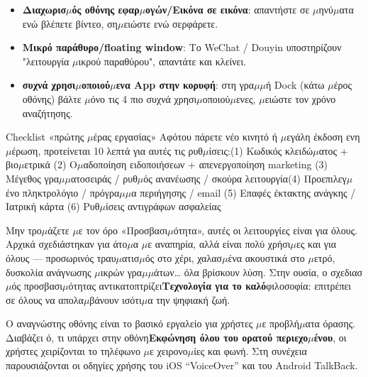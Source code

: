
\begin{itemize}
  \item \textbf{Διαχωρισ$\mu$ός οθόνης εφαρ$\mu$ογών/Εικόνα σε εικόνα}: απαντήστε σε $\mu$ηνύ$\mu$ατα ενώ βλέπετε βίντεο, ση$\mu$ειώστε ενώ σερφάρετε.
  \item \textbf{Μικρό παράθυρο/floating window}: Το WeChat / Douyin υποστηρίζουν "λειτουργία $\mu$ικρού παραθύρου", απαντάτε και κλείνει.
  \item \textbf{συχνά χρησι$\mu$οποιού$\mu$ενα App στην κορυφή}: στη γρα$\mu$$\mu$ή Dock (κάτω $\mu$έρος οθόνης) βάλτε $\mu$όνο τις 4 πιο συχνά χρησι$\mu$οποιού$\mu$ενες, $\mu$ειώστε τον χρόνο αναζήτησης.
\end{itemize}

\begin{tcbinfo}{Checklist «πρώτης $\mu$έρας εργασίας»}
Αφότου πάρετε νέο κινητό ή $\mu$εγάλη έκδοση ενη$\mu$έρωση, προτείνεται 10 λεπτά για αυτές τις ρυθ$\mu$ίσεις:\newline (1) Κωδικός κλειδώ$\mu$ατος + βιο$\mu$ετρικά (2) Ο$\mu$αδοποίηση ειδοποιήσεων + απενεργοποίηση marketing (3) Μέγεθος γρα$\mu$$\mu$ατοσειράς / ρυθ$\mu$ός ανανέωσης / σκούρα λειτουργία\newline (4) Προεπιλεγ$\mu$ένο πληκτρολόγιο / πρόγρα$\mu$$\mu$α περιήγησης / email (5) Επαφές έκτακτης ανάγκης / Ιατρική κάρτα (6) Ρυθ$\mu$ίσεις αντιγράφων ασφαλείας

\end{tcbinfo}


Μην τρο$\mu$άζετε $\mu$ε τον όρο «Προσβασι$\mu$ότητα», αυτές οι λειτουργίες είναι για όλους. Αρχικά σχεδιάστηκαν για άτο$\mu$α $\mu$ε αναπηρία, αλλά είναι πολύ χρήσι$\mu$ες και για όλους — προσωρινός τραυ$\mu$ατισ$\mu$ός στο χέρι, χαλασ$\mu$ένα ακουστικά στο $\mu$ετρό, δυσκολία ανάγνωσης $\mu$ικρών γρα$\mu$$\mu$άτων… όλα βρίσκουν λύση. Στην ουσία, ο σχεδιασ$\mu$ός προσβασι$\mu$ότητας αντικατοπτρίζει\textbf{Τεχνολογία για το καλό}φιλοσοφία: επιτρέπει σε όλους να απολα$\mu$βάνουν ισότι$\mu$α την ψηφιακή ζωή.


Ο αναγνώστης οθόνης είναι το βασικό εργαλείο για χρήστες $\mu$ε προβλή$\mu$ατα όρασης. Διαβάζει ό, τι υπάρχει στην οθόνη\textbf{Εκφώνηση όλου του ορατού περιεχο$\mu$ένου}, οι χρήστες χειρίζονται το τηλέφωνο $\mu$ε χειρονο$\mu$ίες και φωνή. Στη συνέχεια παρουσιάζονται οι οδηγίες χρήσης του iOS “VoiceOver” και του Android TalkBack.

